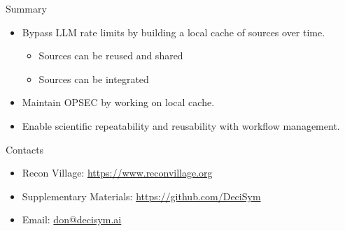 \documentclass[pdf,aspectratio=169]{beamer}
\begin{document}
\begin{frame}{Summary}
  \begin{itemize}
  \item Bypass LLM rate limits by building a local cache of sources over time.    
    \begin{itemize}
    \item Sources can be reused and shared
    \item Sources can be integrated
    \end{itemize}
  \item Maintain OPSEC by working on local cache.
  \item Enable scientific repeatability and reusability with workflow management.
  \end{itemize}
\end{frame}




\begin{frame}{Contacts}
  \begin{itemize}
  \item Recon Village: \url{https://www.reconvillage.org}
  \item Supplementary Materials: \url{https://github.com/DeciSym}
  \item Email: \url{don@decisym.ai}
  \end{itemize}
\end{frame}
\end{document}
